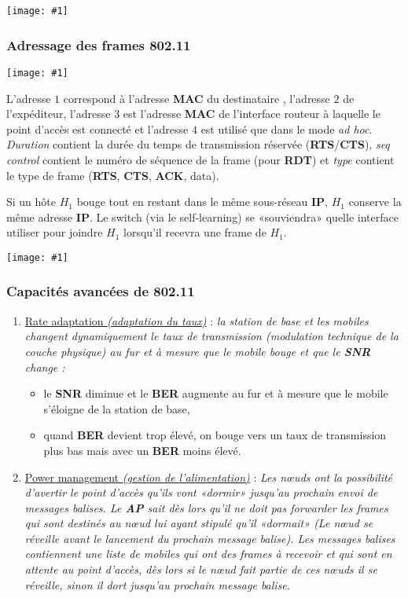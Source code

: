 \documentclass{article}
\newcommand{\ora}[1]{\textcolor{darko}{#1}}
\newcommand{\imgR}[2]{\begin{center}\texttt{[image: \#1]}\end{center}}
\newcommand{\point}[2]{\item \ora{\underline{#1}} : \textit{#2}}
\newcommand{\neuSP}{n\oe ud }
\newcommand{\neuSPs}{n\oe uds }
\begin{document}
\imgR{CN_154.png}{350}

\subsubsection{Adressage des frames 802.11}

\imgR{CN_155.png}{400}
\newpage
\noindent L'adresse $1$ correspond à l'adresse \textbf{MAC} du destinataire , l'adresse $2$ de l'expéditeur, 
l'adresse $3$ est l'adresse \textbf{MAC} de l'interface routeur à laquelle le point d'accès est connecté et 
l'adresse $4$ est utilisé que dans le mode \textit{ad hoc}. \textit{Duration} contient la durée du temps de 
transmission réservée (\textbf{RTS}/\textbf{CTS}), \textit{seq control} contient le numéro de séquence de la 
frame (pour \textbf{RDT}) et \textit{type} contient le type de frame (\textbf{RTS}, \textbf{CTS}, \textbf{ACK}, 
data). \\

\begin{multicols}{2}
$\ $\\
$\ $\\
\noindent Si un hôte $H_1$ bouge tout en restant dans le même sous-réseau \textbf{IP}, $H_1$ conserve la même 
adresse \textbf{IP}. Le switch (via le self-learning) se «souviendra» quelle interface utiliser pour joindre 
$H_1$ lorsqu'il recevra une frame de $H_1$.
\imgR{CN_156.png}{150}
\end{multicols}

\subsubsection{Capacités avancées de 802.11}

\begin{enumerate}
\point{Rate adaptation \textit{(adaptation du taux)}}{la station de base et les mobiles changent dynamiquement le 
taux de transmission (modulation technique de la couche physique) au fur et à mesure que le mobile bouge et que 
le \textbf{SNR} change : }
	\begin{itemize}
	\item le \textbf{SNR} diminue et le \textbf{BER} augmente au fur et à mesure que le mobile s'éloigne de la 
	station de base,
	\item quand \textbf{BER} devient trop élevé, on bouge vers un taux de transmission plus bas mais avec un 
	\textbf{BER} moins élevé.
	\end{itemize}
\point{Power management \textit{(gestion de l'alimentation)}}{Les \neuSPs ont la possibilité d'avertir le point 
d'accès qu'ils vont \textit{«dormir»} jusqu'au prochain envoi de messages balises.  Le \textbf{AP} sait dès lors 
qu'il ne doit pas forwarder les frames qui sont destinés au \neuSP lui ayant stipulé qu'il «dormait» (Le \neuSP 
se réveille avant le lancement du prochain message balise). Les messages balises contiennent une liste de mobiles 
qui ont des frames à recevoir et qui sont en attente au point d'accès, dès lors si le \neuSP fait partie de ces 
\neuSPs il se réveille, sinon il dort jusqu'au prochain message balise.}\\
\end{enumerate}
\end{document}
